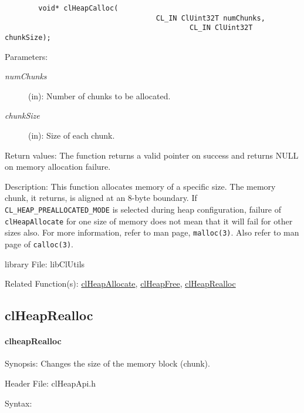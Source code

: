 \begin{flushleft}
\begin{Desc}
\footnotesize\begin{verbatim}        void* clHeapCalloc(
                			        CL_IN ClUint32T numChunks,
                	                        CL_IN ClUint32T chunkSize);
\end{verbatim}
\normalsize
\end{Desc}
\begin{Desc}
\item[Parameters:]
\begin{description}
\item[{\em num\-Chunks}](in): Number of chunks to be allocated.
\item[{\em chunk\-Size}](in): Size of each chunk.
\end{description}
\end{Desc}
\begin{Desc}
\item[Return values:]
 The function returns a valid pointer on success and returns NULL on memory allocation failure.
\end{Desc}
\begin{Desc}
\item[Description:]This function allocates memory of a specific size. The memory chunk, it returns, is aligned at an 8-byte boundary. 
If {\tt{CL\_\-HEAP\_\-PREALLOCATED\_\-MODE}} is selected during heap
configuration, failure of {\tt{clHeapAllocate}} for one size of
memory does not mean that it will fail for other sizes also. For
more information, refer to man page, {\tt{malloc(3)}}. Also refer to man
page of {\tt{calloc(3)}}.\end{Desc}
\begin{Desc}
\item[library File:]lib\-Cl\-Utils\end{Desc}
\begin{Desc}
\item[Related Function(s):]\hyperlink{pageheap128}{clHeapAllocate}, \hyperlink{pageheap130}{clHeapFree}, \hyperlink{pageheap105}{clHeapRealloc} \end{Desc}
\newpage



\subsection{clHeapRealloc}
\hypertarget{pageheap105}{}\paragraph{cl\-heap\-Realloc}\label{pageheap105}
\begin{Desc}
\item[Synopsis:]Changes the size of the memory block (chunk).\end{Desc}
\begin{Desc}
\item[Header File:]clHeapApi.h\end{Desc}
\begin{Desc}
\item[Syntax:]


\end{Desc}
\end{flushleft}
